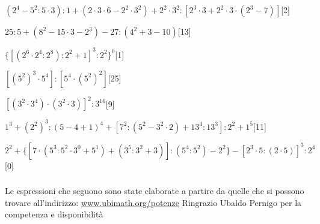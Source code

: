 \begin{esercizio} \label{ese:1.17}
$(2^4-5^2:5\cdot3):1+(2\cdot3\cdot6-2^2\cdot3^2)+2^2\cdot3^2:[2^3\cdot3+2^2\cdot3\cdot(2^3-7)]$\hfill[2]
\end{esercizio}
\begin{esercizio} \label{ese:1.17}
$25:5+(8^2-15\cdot3-2^3)-27:(4^2+3-10)$\hfill[13]
\end{esercizio}
\begin{esercizio} \label{ese:1.17}
$\{[(2^6\cdot2^4:2^8):2^2+1]^3:2^2\}^0$\hfill[1]
\end{esercizio}
\begin{esercizio} \label{ese:1.17}
$[(5^2)^3\cdot5^4]:[5^4\cdot(5^2)^2]$\hfill[25]
\end{esercizio}
\begin{esercizio} \label{ese:1.17}
$[(3^2\cdot3^4)\cdot(3^2\cdot3)]^2:3^{16}$\hfill[9]
\end{esercizio}
\begin{esercizio} \label{ese:1.17}
$1^3+(2^2)^3:(5-4+1)^4+[7^2:(5^2-3^2\cdot2)+13^4:13^3]:2^2+1^5$\hfill[11]
\end{esercizio}
\begin{esercizio} \label{ese:1.17}
$2^2+\{[7\cdot(5^3:5^2\cdot3^0+5^1)+(3^5:3^2+3)]:(5^4:5^2)-2^2\}-[2^3\cdot5:(2\cdot5)]^3:2^4$\hfill[0]
\end{esercizio}

\subsubsection*{}


Le espressioni che seguono sono state elaborate a partire da quelle che si 
possono trovare all'indirizzo:
\href{http:// www.ubimath.org/potenze}{ www.ubimath.org/potenze}
Ringrazio Ubaldo Pernigo per la competenza e disponibilità

